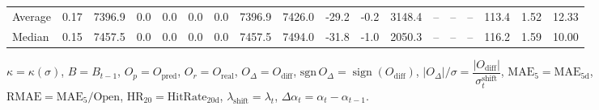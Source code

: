 \begin{threeparttable}
{\begin{tabular}{lrrrrrrrrrrrrrrrrr}
Average &     0.17 & 7396.9 &               0.0 &               0.0 &                0.0 &                0.0 & 7396.9 & 7426.0 &      -29.2 &                     -0.2 &              3148.4 &         -- &        -- &             -- &            113.4 &            1.52 &                  12.33 \\
 Median &     0.15 & 7457.5 &               0.0 &               0.0 &                0.0 &                0.0 & 7457.5 & 7494.0 &      -31.8 &                     -1.0 &              2050.3 &         -- &        -- &             -- &            116.2 &            1.59 &                  10.00 \\
\bottomrule
\end{tabular}
}
\begin{tablenotes}\footnotesize
\item $\kappa=\kappa(\sigma)$, $B=B_{t-1}$, $O_p=O_{\text{pred}}$, $O_r=O_{\text{real}}$, $O_\Delta=O_{\text{diff}}$, $\mathrm{sgn}\,O_\Delta=\operatorname{sign}(O_{\text{diff}})$, $|O_\Delta|/\sigma=\dfrac{|O_{\text{diff}}|}{\sigma_t^{\text{shift}}}$, $\mathrm{MAE}_5=\mathrm{MAE}_{5\text{d}}$, $\mathrm{RMAE}= \mathrm{MAE}_5 / \text{Open}$, $\mathrm{HR}_{20}=\mathrm{HitRate}_{20\text{d}}$, 
$\lambda_{\text{shift}}=\lambda_t$, 
$\Delta\alpha_t=\alpha_t-\alpha_{t-1}$.
\end{tablenotes}
\end{threeparttable}
\endgroup

